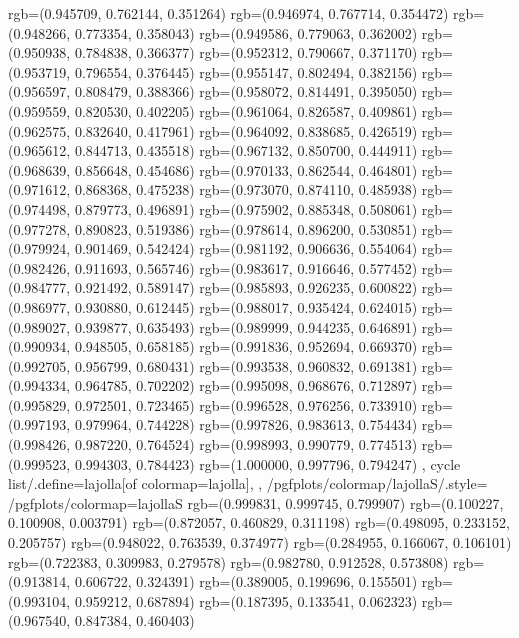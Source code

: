 {{{					rgb=(0.945709, 0.762144, 0.351264)
					rgb=(0.946974, 0.767714, 0.354472)
					rgb=(0.948266, 0.773354, 0.358043)
					rgb=(0.949586, 0.779063, 0.362002)
					rgb=(0.950938, 0.784838, 0.366377)
					rgb=(0.952312, 0.790667, 0.371170)
					rgb=(0.953719, 0.796554, 0.376445)
					rgb=(0.955147, 0.802494, 0.382156)
					rgb=(0.956597, 0.808479, 0.388366)
					rgb=(0.958072, 0.814491, 0.395050)
					rgb=(0.959559, 0.820530, 0.402205)
					rgb=(0.961064, 0.826587, 0.409861)
					rgb=(0.962575, 0.832640, 0.417961)
					rgb=(0.964092, 0.838685, 0.426519)
					rgb=(0.965612, 0.844713, 0.435518)
					rgb=(0.967132, 0.850700, 0.444911)
					rgb=(0.968639, 0.856648, 0.454686)
					rgb=(0.970133, 0.862544, 0.464801)
					rgb=(0.971612, 0.868368, 0.475238)
					rgb=(0.973070, 0.874110, 0.485938)
					rgb=(0.974498, 0.879773, 0.496891)
					rgb=(0.975902, 0.885348, 0.508061)
					rgb=(0.977278, 0.890823, 0.519386)
					rgb=(0.978614, 0.896200, 0.530851)
					rgb=(0.979924, 0.901469, 0.542424)
					rgb=(0.981192, 0.906636, 0.554064)
					rgb=(0.982426, 0.911693, 0.565746)
					rgb=(0.983617, 0.916646, 0.577452)
					rgb=(0.984777, 0.921492, 0.589147)
					rgb=(0.985893, 0.926235, 0.600822)
					rgb=(0.986977, 0.930880, 0.612445)
					rgb=(0.988017, 0.935424, 0.624015)
					rgb=(0.989027, 0.939877, 0.635493)
					rgb=(0.989999, 0.944235, 0.646891)
					rgb=(0.990934, 0.948505, 0.658185)
					rgb=(0.991836, 0.952694, 0.669370)
					rgb=(0.992705, 0.956799, 0.680431)
					rgb=(0.993538, 0.960832, 0.691381)
					rgb=(0.994334, 0.964785, 0.702202)
					rgb=(0.995098, 0.968676, 0.712897)
					rgb=(0.995829, 0.972501, 0.723465)
					rgb=(0.996528, 0.976256, 0.733910)
					rgb=(0.997193, 0.979964, 0.744228)
					rgb=(0.997826, 0.983613, 0.754434)
					rgb=(0.998426, 0.987220, 0.764524)
					rgb=(0.998993, 0.990779, 0.774513)
					rgb=(0.999523, 0.994303, 0.784423)
					rgb=(1.000000, 0.997796, 0.794247)
			},
		cycle list/.define={lajolla}{[of colormap=lajolla]},
		},
		/pgfplots/colormap/lajollaS/.style={
			/pgfplots/colormap={lajollaS}{%
					rgb=(0.999831, 0.999745, 0.799907)
					rgb=(0.100227, 0.100908, 0.003791)
					rgb=(0.872057, 0.460829, 0.311198)
					rgb=(0.498095, 0.233152, 0.205757)
					rgb=(0.948022, 0.763539, 0.374977)
					rgb=(0.284955, 0.166067, 0.106101)
					rgb=(0.722383, 0.309983, 0.279578)
					rgb=(0.982780, 0.912528, 0.573808)
					rgb=(0.913814, 0.606722, 0.324391)
					rgb=(0.389005, 0.199696, 0.155501)
					rgb=(0.993104, 0.959212, 0.687894)
					rgb=(0.187395, 0.133541, 0.062323)
					rgb=(0.967540, 0.847384, 0.460403)
}}}
